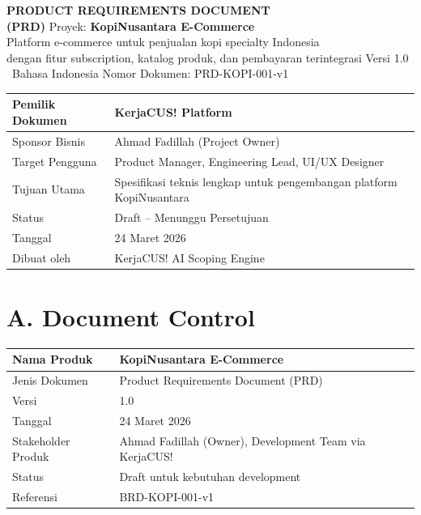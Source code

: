 \documentclass[11pt,a4paper]{article}
\begin{document}
\thispagestyle{fancy}
\begin{center}
\vspace*{3cm}
{\fontsize{15}{18}\bfseries PRODUCT REQUIREMENTS DOCUMENT\\(PRD)}
\vspace{1cm}
{\large Proyek: \textbf{KopiNusantara E-Commerce}}\\[0.3cm]
{\normalsize Platform e-commerce untuk penjualan kopi specialty Indonesia\\dengan fitur subscription, katalog produk, dan pembayaran terintegrasi}
\vspace{1cm}
{\normalsize Versi 1.0 \textbullet\ Bahasa Indonesia}
\vspace{0.5cm}
{\small Nomor Dokumen: PRD-KOPI-001-v1}
\end{center}
\vspace{2cm}
\noindent\small
\begin{tabularx}{\textwidth}{|X|X|}
\hline
\centering\textbf{Pemilik Dokumen}\arraybackslash & \centering\textbf{KerjaCUS! Platform}\arraybackslash \\\hline
Sponsor Bisnis & Ahmad Fadillah (Project Owner) \\\hline
Target Pengguna & Product Manager, Engineering Lead, UI/UX Designer \\\hline
Tujuan Utama & Spesifikasi teknis lengkap untuk pengembangan platform KopiNusantara \\\hline
Status & Draft -- Menunggu Persetujuan \\\hline
Tanggal & 24 Maret 2026 \\\hline
Dibuat oleh & KerjaCUS! AI Scoping Engine \\\hline
\end{tabularx}\normalsize

\newpage

\section{A. Document Control}
\noindent\small
\begin{tabularx}{\textwidth}{|X|X|}
\hline
\centering\textbf{Nama Produk}\arraybackslash & \centering\textbf{KopiNusantara E-Commerce}\arraybackslash \\\hline
Jenis Dokumen & Product Requirements Document (PRD) \\\hline
Versi & 1.0 \\\hline
Tanggal & 24 Maret 2026 \\\hline
Stakeholder Produk & Ahmad Fadillah (Owner), Development Team via KerjaCUS! \\\hline
Status & Draft untuk kebutuhan development \\\hline
Referensi & BRD-KOPI-001-v1 \\\hline
\end{tabularx}\normalsize
\end{document}
